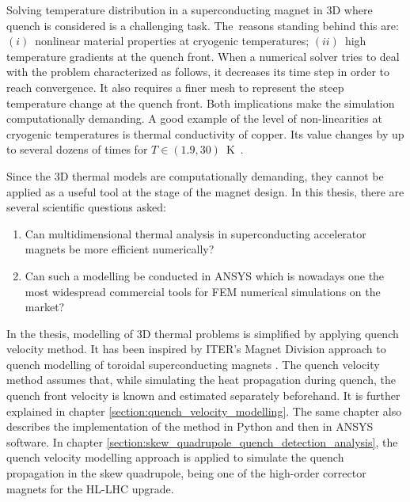 
Solving temperature distribution in a superconducting magnet in 3D where quench is considered is a challenging task. The~reasons standing behind this are: $(i)$~nonlinear material properties at cryogenic temperatures; $(ii)$~high temperature gradients at the quench front. When a numerical solver tries to deal with the problem characterized as follows, it decreases its time step in order to reach convergence. It also requires a finer mesh to represent the steep temperature change at the quench front. Both implications make the simulation computationally demanding. A good example of the level of non-linearities at cryogenic temperatures is thermal conductivity of copper. Its value changes by up to several dozens of times for $T \in (1.9, 30)$~K~\cite{paudel_thesis}.

Since the 3D thermal models are computationally demanding, they cannot be applied as a useful tool at the stage of the magnet design. In this thesis, there are several scientific questions asked:
\begin{enumerate}
\item Can multidimensional thermal analysis in superconducting accelerator magnets be more efficient numerically?
\item  Can such a modelling be conducted in ANSYS which is nowadays one the most widespread commercial tools for FEM numerical simulations on the market?
\end{enumerate}

In the thesis, modelling of 3D thermal problems is simplified by applying quench velocity method. It has been inspired by ITER's Magnet Division approach to quench modelling of toroidal superconducting magnets \cite{iter_presentation_qualified_analysis, iter_fault_case_study}. The quench velocity method assumes that, while simulating the heat propagation during quench, the quench front velocity is known and estimated separately beforehand. It is further explained in chapter \ref{section:quench_velocity_modelling}. The same chapter also describes the implementation of the method in Python and then in ANSYS software. In chapter \ref{section:skew_quadrupole_quench_detection_analysis}, the quench velocity modelling approach is applied to simulate the quench propagation in the skew quadrupole, being one of the high-order corrector magnets for the HL-LHC upgrade.